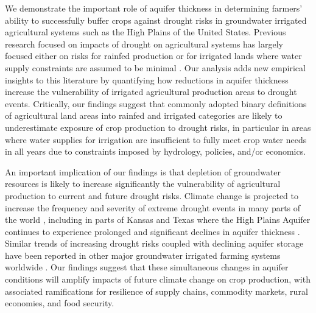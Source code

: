 \documentclass[
]{article}
\begin{document}
We demonstrate the important role of aquifer thickness in determining farmers' ability to successfully buffer crops against drought risks in groundwater irrigated agricultural systems such as the High Plains of the United States. Previous research focused on impacts of drought on agricultural systems has largely focused either on risks for rainfed production \citep{schlenker2009nonlinear, lobell2014greater, schlenker2010robust, zhou2020connections, borgomeo2020impact} or for irrigated lands where water supply constraints are assumed to be minimal \citep{kuwayama2019estimating, zipper2016drought, zhu2022untangling, zhu2022warming, lu2020mapping, davis2019sensitivity, li2018changes, luan2021combined}. Our analysis adds new empirical insights to this literature by quantifying how reductions in aquifer thickness increase the vulnerability of irrigated agricultural production areas to drought events. Critically, our findings suggest that commonly adopted binary definitions of agricultural land areas into rainfed and irrigated categories are likely to underestimate exposure of crop production to drought risks, in particular in areas where water supplies for irrigation are insufficient to fully meet crop water needs in all years due to constraints imposed by hydrology, policies, and/or economics.

An important implication of our findings is that depletion of groundwater resources is likely to increase significantly the vulnerability of agricultural production to current and future drought risks. Climate change is projected to increase the frequency and severity of extreme drought events in many parts of the world \citep{ukkola2020robust, chiang2021evidence, cook2020twenty}, including in parts of Kansas and Texas \citep{bradford2020robust, cook2022projected, mullens2019quantitative} where the High Plains Aquifer continues to experience prolonged and significant declines in aquifer thickness \citep{scanlon2012groundwater, haacker2016water, cotterman2018groundwater}. Similar trends of increasing drought risks coupled with declining aquifer storage have been reported in other major groundwater irrigated farming systems worldwide \citep{wada2010global, doll2014global, famiglietti2014global, feng2018groundwater, bierkens2019non}. Our findings suggest that these simultaneous changes in aquifer conditions will amplify impacts of future climate change on crop production, with associated ramifications for resilience of supply chains, commodity markets, rural economies, and food security.
\end{document}
